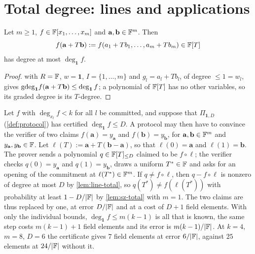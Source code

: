 \section{Total degree: lines and applications}

\begin{lemma}\label{lem:line-total}
Let $m\ge1$, $f\in\mathbb{F}[x_1,\dots,x_m]$ and $\mathbf a,\mathbf b\in\mathbb{F}^m$. Then
\[
f(\mathbf a+T\mathbf b):=f(a_1+Tb_1,\dots,a_m+Tb_m)\in\mathbb{F}[T]
\]
has degree at most $\deg_{\mathbf 1}f$.
\end{lemma}

\begin{proof}
 with $R=\mathbb{F}$, $w=\mathbf 1$, $I=\{1,\dots,m\}$ and $g_l=a_l+Tb_l$, of degree
$\le1=w_l$, gives $\mathrm{gdeg}_{\mathbf 1}f(\mathbf a+T\mathbf b)\le\deg_{\mathbf 1}f$; a polynomial of
$\mathbb{F}[T]$ has no other variables, so its graded degree is its $T$-degree.
\end{proof}

\begin{remark}\label{rem:total-app}
Let $f$ with $\deg_{x_l}f<k$ for all $l$ be committed, and suppose that $\Pi_{\mathbf 1,D}$
(\cref{def:protocol}) has certified $\deg_{\mathbf 1}f\le D$. A protocol may then have to convince
the verifier of two claims $f(\mathbf a)=y_{\mathbf a}$ and $f(\mathbf b)=y_{\mathbf b}$, for
$\mathbf a,\mathbf b\in\mathbb{F}^m$ and $y_{\mathbf a},y_{\mathbf b}\in\mathbb{F}$. Let
$\ell(T):=\mathbf a+T(\mathbf b-\mathbf a)$, so that $\ell(0)=\mathbf a$ and $\ell(1)=\mathbf b$. The
prover sends a polynomial $q\in\mathbb{F}[T]_{\le D}$ claimed to be $f\circ\ell$; the verifier checks
$q(0)=y_{\mathbf a}$ and $q(1)=y_{\mathbf b}$, draws a uniform $T^*\in\mathbb{F}$ and asks for an opening of
the commitment at $\ell(T^*)\in\mathbb{F}^m$. If $q\ne f\circ\ell$, then $q-f\circ\ell$ is nonzero of degree
at most $D$ by \cref{lem:line-total}, so $q(T^*)\ne f(\ell(T^*))$ with probability at least
$1-D/|\mathbb{F}|$ by \cref{lem:sz-total} with $m=1$. The two claims are thus replaced by one, at error
$D/|\mathbb{F}|$ and at a cost of $D+1$ field elements. With only the individual bounds,
$\deg_{\mathbf 1}f\le m(k-1)$ is all that is known, the same step costs $m(k-1)+1$ field elements and
its error is $m(k-1)/|\mathbb{F}|$. At
$k=4$, $m=8$, $D=6$ the certificate gives $7$ field elements at error $6/|\mathbb{F}|$, against $25$
elements at $24/|\mathbb{F}|$ without it.
\end{remark}

